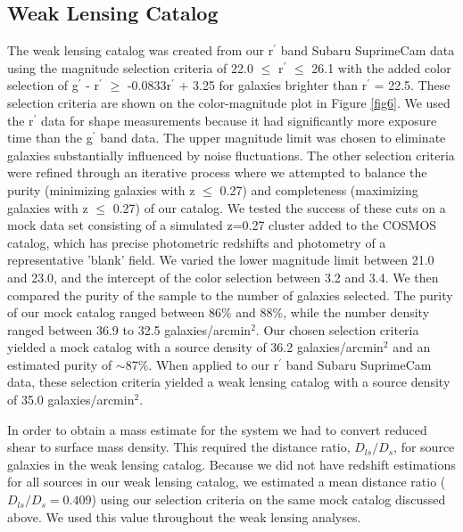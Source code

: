 \documentclass[onecolumn]{aastex}
\begin{document}
\subsection{Weak Lensing Catalog}
The weak lensing catalog was created from our r$^\prime$ band Subaru SuprimeCam data using the magnitude selection criteria of 22.0 $\leq$ r$^{\prime}$ $\leq$ 26.1 with the added color selection of g$^\prime$ - r$^\prime$ $\geq$ -0.0833r$^\prime$ + 3.25 for galaxies brighter than r$^\prime$ = 22.5.  These selection criteria are shown on the color-magnitude plot in Figure \ref{fig6}.  We used the r$^{\prime}$ data for shape measurements because it had significantly more exposure time than the g$^\prime$ band data.  The upper magnitude limit was chosen to eliminate galaxies substantially influenced by noise fluctuations.  The other selection criteria were refined through an iterative process where we attempted to balance the purity (minimizing galaxies with z $\leq$ 0.27) and completeness (maximizing galaxies with z $\leq$ 0.27) of our catalog.  We tested the success of these cuts on a mock data set consisting of a simulated z=0.27 cluster added to the COSMOS catalog, which has precise photometric redshifts and photometry of a representative 'blank' field.  We varied the lower magnitude limit between 21.0 and 23.0, and the intercept of the color selection between 3.2 and 3.4.  We then compared the purity of the sample to the number of galaxies selected.  The purity of our mock catalog ranged between 86\% and 88\%, while the number density ranged between 36.9 to 32.5 galaxies/arcmin$^2$.  Our chosen selection criteria yielded a mock catalog with a source density of 36.2 galaxies/arcmin$^2$ and an estimated purity of $\sim$87\%.  When applied to our r$^\prime$ band Subaru SuprimeCam data, these selection criteria yielded a weak lensing catalog with a source density of 35.0 galaxies/arcmin$^2$.

In order to obtain a mass estimate for the system we had to convert reduced shear to surface mass density.  This required the distance ratio, $D_{ls}/D_s$, for source galaxies in the weak lensing catalog.  Because we did not have redshift estimations for all sources in our weak lensing catalog, we estimated a mean distance ratio ($D_{ls}/D_s = 0.409$) using our selection criteria on the same mock catalog discussed above.  We used this value throughout the weak lensing analyses.
\end{document}
